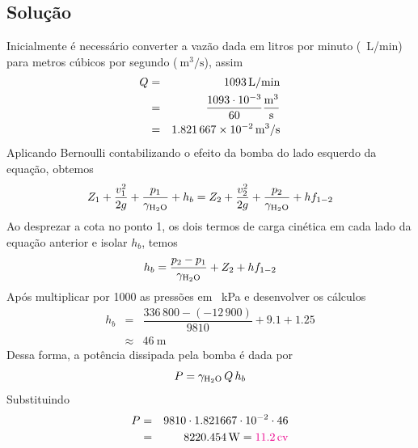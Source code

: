 \documentclass[a4paper, 12pt, brazilian]{article}
\newcommand{\purple}[1]{\textcolor{magenta}{#1}}
\begin{document}
	\subsection{Solução}
	Inicialmente é necessário converter a vazão dada em litros por minuto (\SI{}{\liter/\minute}) para metros cúbicos por segundo ($\SI{}{\meter^{3}/\second}$), assim
	\begin{eqnarray}
		Q&=&\SI{1093}{\liter/\minute}\\
		 &=&\dfrac{1093\cdot 10^{-3}}{60}\SI{}{\dfrac{\meter^{3}}{\second}}\\
		 &=&\SI{1.821667e-2}{\meter^{3}/\second}
	\end{eqnarray}
	Aplicando Bernoulli contabilizando o efeito da bomba do lado esquerdo da equação, obtemos
	\begin{equation}
		Z_{1}+\dfrac{v_{1}^{2}}{2g}+\dfrac{p_{1}}{\gamma_{\ce{H2O}}}+h_{b}=Z_{2}+\dfrac{v_{2}^{2}}{2g}+\dfrac{p_{2}}{\gamma_{\ce{H2O}}}+hf_{1-2}\\
	\end{equation}
	Ao desprezar a cota no ponto 1, os dois termos de carga cinética em cada lado da equação anterior e isolar $h_{b}$, temos
	\begin{equation}
		h_{b}=\dfrac{p_{2}-p_{1}}{\gamma_{\ce{H2O}}}+Z_{2}+hf_{1-2}
	\end{equation}
	Após multiplicar por 1000 as pressões em \SI{}{\kilo\pascal} e desenvolver os cálculos
	\begin{eqnarray}
		h_{b}&=&\dfrac{336\,800-(-12\,900)}{9810}+9.1+1.25\\
			 &\approx&\SI{46}{\meter}
	\end{eqnarray}
	Dessa forma, a potência dissipada pela bomba é dada por
	\begin{equation}
		P=\gamma_{\ce{H2O}}\,Q\,h_{b}
	\end{equation}
	Substituindo
	\begin{eqnarray}
		P&=&9810\cdot 1.821667\cdot 10^{-2}\cdot 46\\
		 &=&\SI{8220.454}{\watt}=\purple{\SI{11.2}{cv}}
	\end{eqnarray}
\end{document}
